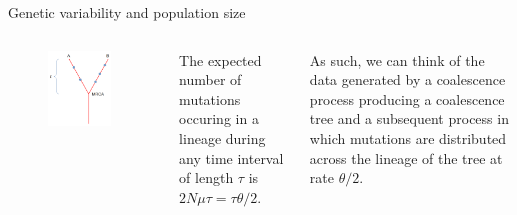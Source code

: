 \begin{frame}{Genetic variability and population size}

        \begin{columns}


                \begin{figure}
                        \includegraphics[width=0.9\textwidth]{Pics/tau}
                \end{figure}

 
		The expected number of mutations occuring in a lineage during any time interval of length $\tau$ is 
		$2N\mu\tau=\tau \theta /2$.

		\bigskip
		\small

		As such, we can think of the data generated by a coalescence process producing a coalescence tree and a 
		subsequent process in which mutations are distributed across the lineage of the tree at rate $\theta /2$.

        \end{columns}

\end{frame}


